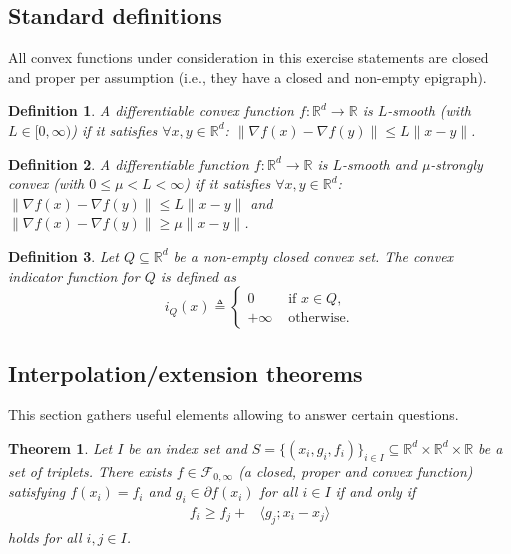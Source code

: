 \documentclass[11pt,a4paper]{article}
\newtheorem{theorem}{Theorem}
\newtheorem{definition}{Definition}
\begin{document}
	\subsection{Standard definitions}
	All convex functions under consideration in this exercise statements are closed and proper per assumption (i.e., they have a closed and non-empty epigraph).
	\begin{definition}\label{def:smoothconvex}
	A differentiable convex function $f:\mathbb{R}^d\rightarrow \mathbb{R}$ is $L$-smooth (with $L\in [0,\infty)$) if it satisfies $\forall x,y\in\mathbb{R}^d$: $\|\nabla f(x)-\nabla f(y)\|\leqslant L \|x-y\|$.
	\end{definition}
	\begin{definition}\label{def:smoothstronglyconvex}
	A differentiable function $f:\mathbb{R}^d\rightarrow \mathbb{R}$ is $L$-smooth and $\mu$-strongly convex (with $0\leqslant \mu<L<\infty$) if it satisfies $\forall x,y\in\mathbb{R}^d$: $\|\nabla f(x)-\nabla f(y)\|\leqslant L \|x-y\|$ and $\|\nabla f(x)-\nabla f(y)\|\geqslant \mu \|x-y\|$.
	\end{definition}
	\begin{definition}\label{def:indicator}
	Let $Q\subseteq \mathbb{R}^d$ be a non-empty closed convex set. The convex indicator function for $Q$ is defined as 
	\[ i_Q(x) \triangleq \left\{\begin{array}{ll}0 &\text{ if }x\in Q,\\+\infty &\text{ otherwise.}\end{array}\right. \]
	\end{definition}
	
	\subsection{Interpolation/extension theorems}
	This section gathers useful elements allowing to answer certain questions.


	\begin{theorem}Let $I$ be an index set and $S=\{(x_i,g_i,f_i)\}_{i\in I}\subseteq \mathbb{R}^d\times\mathbb{R}^d\times \mathbb{R}$ be a set of triplets. There exists $f\in\mathcal{F}_{0,\infty}$ (a closed, proper and convex function) satisfying $f(x_i)=f_i$ and $g_i\in\partial f(x_i)$ for all $i\in I$ if and only if
\begin{equation*}
\begin{aligned}
f_i\geqslant f_j+&\langle g_j;x_i-x_j\rangle
\end{aligned}
\end{equation*}
holds for all $i,j\in I$.
	\end{theorem}
	
\end{document}
